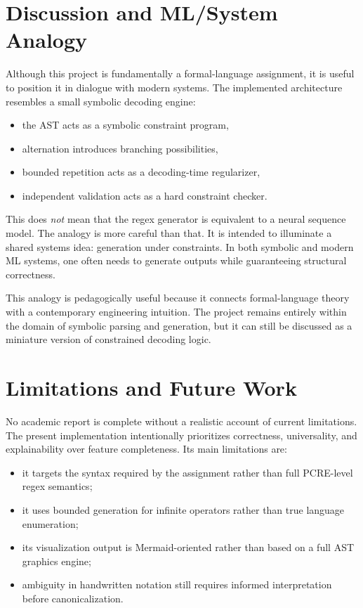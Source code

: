 \documentclass[a4paper,12pt]{article}
\begin{document}
\section{Discussion and ML/System Analogy}

Although this project is fundamentally a formal-language assignment, it is useful to position it in dialogue with modern systems. The implemented architecture resembles a small symbolic decoding engine:

\begin{itemize}
    \item the AST acts as a symbolic constraint program,
    \item alternation introduces branching possibilities,
    \item bounded repetition acts as a decoding-time regularizer,
    \item independent validation acts as a hard constraint checker.
\end{itemize}

This does \emph{not} mean that the regex generator is equivalent to a neural sequence model. The analogy is more careful than that. It is intended to illuminate a shared systems idea: generation under constraints. In both symbolic and modern ML systems, one often needs to generate outputs while guaranteeing structural correctness.

This analogy is pedagogically useful because it connects formal-language theory with a contemporary engineering intuition. The project remains entirely within the domain of symbolic parsing and generation, but it can still be discussed as a miniature version of constrained decoding logic.

\section{Limitations and Future Work}

No academic report is complete without a realistic account of current limitations. The present implementation intentionally prioritizes correctness, universality, and explainability over feature completeness. Its main limitations are:

\begin{itemize}
    \item it targets the syntax required by the assignment rather than full PCRE-level regex semantics;
    \item it uses bounded generation for infinite operators rather than true language enumeration;
    \item its visualization output is Mermaid-oriented rather than based on a full AST graphics engine;
    \item ambiguity in handwritten notation still requires informed interpretation before canonicalization.
\end{itemize}
\end{document}
